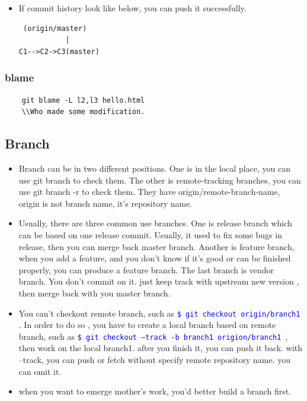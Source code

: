 \documentclass[a4paper,12pt,twoside]{book}
\newcommand{\linuxcommand}[1]{\texttt{\textcolor{blue}{\$ #1 \Pisymbol{psy}{191}}}}
\begin{document}
\begin{itemize}
\begin{itemize}
\begin{itemize}
\item If commit history look like below, you can push it successfully.
\begin{verbatim}
 (origin/master)
           |
C1-->C2->C3(master)
\end{verbatim}
\end{itemize}
\subsubsection{blame} 
    \begin{verbatim}
    git blame -L l2,l3 hello.html
    \\Who made some modification.
    \end{verbatim}


\subsection{Branch}
\begin{itemize}

\item Branch can be in  two different positions. One is in the local place, you can use git branch to check them. The other is remote-tracking branches, you can use git branch -r to check them. They have origin/remote-branch-name, origin is not branch name, it's repository  name. 

\item Usually, there are three common use branches. One is release branch which can be based on one release commit. Usually, it used to fix some bugs in release, then you can merge back master branch. Another is feature branch, when you add a feature, and you don't know if it's good or can be finished properly, you can produce a feature branch. The last branch is vendor branch. You don't commit on it. just keep track with upstream new version , then merge back with you master branch.

\item You can't checkout remote branch, such as \linuxcommand{git checkout origin/branch1}. In order to do so , you have to create a local branch based on remote branch, such as \linuxcommand{git checkout --track -b branch1 origion/branch1}, then work on the local branch1. after you finish it, you can push it back. with --track, you can push or fetch without specify remote repository name. you can omit it.

\item when you want to emerge mother's work, you'd better build a branch first.


\end{itemize}
\end{itemize}
\end{itemize}
\end{document}
